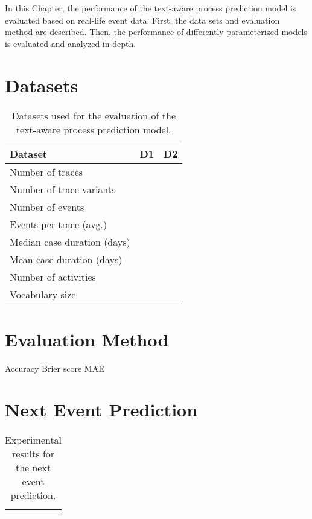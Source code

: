 In this Chapter, the performance of the text-aware process prediction model is evaluated based on real-life event data.
First, the data sets and evaluation method are described. Then, the performance of differently parameterized models is evaluated and analyzed in-depth.


\section{Datasets}

\begin{table}[!htbp]
	\begin{tabularx}{\textwidth}{l l l }
		\toprule
		\textbf{Dataset} & \textbf{D1} & \textbf{D2}  \\
		\midrule
		Number of traces & & \\
		Number of trace variants & & \\
		Number of events & & \\
		Events per trace (avg.) & & \\
		Median case duration (days) & & \\
		Mean case duration (days)& & \\
		Number of activities & & \\
		Vocabulary size & & \\
		\bottomrule
	\end{tabularx}
	\caption[Evaluated datasets]{Datasets used for the evaluation of the text-aware process prediction model.}
	\label{tab:packages}
\end{table}

\section{Evaluation Method}


Accuracy
Brier score \cite{Brier1950VERIFICATIONOF}
MAE


\section{Next Event Prediction}

\begin{table}[!htbp]
	\begin{tabularx}{\textwidth}{l l l l }
		\toprule
		& & &  \\
		\midrule
		& & & \\
		\bottomrule
	\end{tabularx}
	\caption[Experimental results for the next event prediction]{Experimental results for the next event prediction.}
	\label{tab:next-event}
\end{table}


